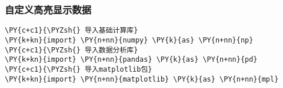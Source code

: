     \hypertarget{ux81eaux5b9aux4e49ux9ad8ux4eaeux663eux793aux6570ux636e}{%
\subsubsection{自定义高亮显示数据}\label{ux81eaux5b9aux4e49ux9ad8ux4eaeux663eux793aux6570ux636e}}

    \begin{tcolorbox}[breakable, size=fbox, boxrule=1pt, pad at break*=1mm,colback=cellbackground, colframe=cellborder]
\begin{Verbatim}[commandchars=\\\{\}]
\PY{c+c1}{\PYZsh{} 导入基础计算库}
\PY{k+kn}{import} \PY{n+nn}{numpy} \PY{k}{as} \PY{n+nn}{np}
\PY{c+c1}{\PYZsh{} 导入数据分析库}
\PY{k+kn}{import} \PY{n+nn}{pandas} \PY{k}{as} \PY{n+nn}{pd}
\PY{c+c1}{\PYZsh{} 导入matplotlib包}
\PY{k+kn}{import} \PY{n+nn}{matplotlib} \PY{k}{as} \PY{n+nn}{mpl}
\end{Verbatim}
\end{tcolorbox}

